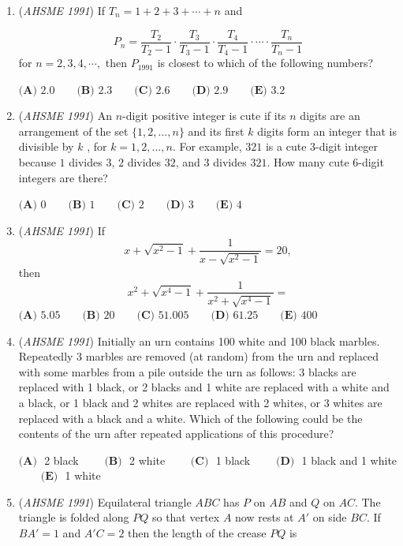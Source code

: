 \begin{enumerate}
 $\textbf{(A) } y=\log_{10}\left(\frac{x+90}{9}\right) \qquad \textbf{(B) } y=\log_{x}10 \qquad \textbf{(C) } y=\frac{1}{x+1} \qquad \textbf{(D) } y=10^{-x} \qquad \textbf{(E) } y=10^x$


	\item (\textit{AHSME 1991}) If $T_n=1+2+3+\cdots +n$ and

 \[P_n=\frac{T_2}{T_2-1}\cdot\frac{T_3}{T_3-1}\cdot\frac{T_4}{T_4-1}\cdot\cdots\cdot\frac{T_n}{T_n-1}\]
for $n=2,3,4,\cdots,$ then $P_{1991}$ is closest to which of the following numbers?


 $\textbf{(A) } 2.0\qquad \textbf{(B) } 2.3\qquad \textbf{(C) } 2.6\qquad \textbf{(D) } 2.9\qquad \textbf{(E) } 3.2$


	\item (\textit{AHSME 1991}) An $n$-digit positive integer is cute if its $n$ digits are an arrangement of the set $\{1,2,...,n\}$ and its first 
$k$ digits form an integer that is divisible by $k$  , for  $k  = 1,2,...,n$. For example, $321$ is a cute $3$-digit integer because $1$ divides $3$, $2$ divides $32$, and $3$ divides $321$. How many cute $6$-digit integers are there?


 $\textbf{(A) } 0\qquad \textbf{(B) } 1\qquad \textbf{(C) } 2\qquad \textbf{(D) } 3\qquad \textbf{(E) } 4$


	\item (\textit{AHSME 1991}) If 
 \[x+\sqrt{x^2-1}+\frac{1}{x-\sqrt{x^2-1}}=20,\] then 
 \[x^2+\sqrt{x^4-1}+\frac{1}{x^2+\sqrt{x^4-1}}=\]
$\textbf{(A) } 5.05 \qquad \textbf{(B) } 20 \qquad \textbf{(C) } 51.005 \qquad \textbf{(D) } 61.25 \qquad \textbf{(E) } 400$


	\item (\textit{AHSME 1991}) Initially an urn contains 100 white and 100 black marbles. Repeatedly 3 marbles are removed (at random) from the urn and replaced with some marbles from a pile outside the urn as follows: 3 blacks are replaced with 1 black, or 2 blacks and 1 white are replaced with a white and a black, or 1 black and 2 whites are replaced with 2 whites, or 3 whites are replaced with a black and a white. Which of the following could be the contents of the urn after repeated applications of this procedure?


 $\textbf{(A) }$ 2 black $\qquad \textbf{(B) }$ 2 white $\qquad \textbf{(C) }$ 1 black $\qquad \textbf{(D) }$ 1 black and 1 white $\qquad \textbf{(E) }$ 1 white


 

	\item (\textit{AHSME 1991}) Equilateral triangle $ABC$ has $P$ on $AB$ and $Q$ on $AC$. The triangle is folded along $PQ$ so that vertex $A$ now rests at $A'$ on side $BC$. If $BA'=1$ and $A'C=2$ then the length of the crease $PQ$ is



\end{enumerate}
